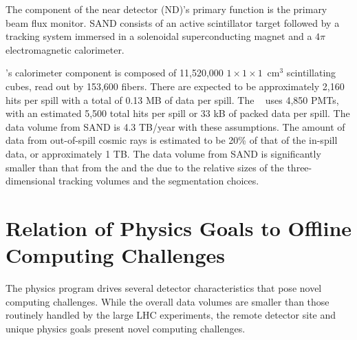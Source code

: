 \documentclass[../main-v1.tex]{subfiles}
\begin{document}
The  component of the near detector (ND)'s primary function is the primary beam flux monitor.   SAND consists of an active scintillator target  followed by a tracking system immersed in a solenoidal superconducting magnet  and  a $4\pi$ electromagnetic calorimeter.

's  calorimeter component is composed of 11,520,000 $1\times 1\times 1$~cm$^3$ scintillating cubes, read out by 153,600 fibers.  There are expected to be approximately 2,160 hits per spill with a total of 0.13 MB of data per spill.  The  ~\cite{Adinolfi:2002zx} uses 4,850 PMTs, with an estimated 5,500 total hits per spill or 33 kB of packed data per spill.   The data volume from SAND is 4.3 TB/year with these assumptions.  The amount of data from out-of-spill cosmic rays is estimated to be 20\% of that of the in-spill data, or approximately 1 TB.  The data volume from SAND is significantly smaller than that from the  and the  due to the relative sizes of the three-dimensional tracking volumes and the segmentation choices.






\section{Relation of Physics Goals to Offline Computing Challenges}

The physics program drives several detector characteristics that pose novel computing challenges.  While the overall data volumes are smaller than those routinely handled by the large LHC experiments, the remote detector site and unique physics goals present novel computing challenges. 
\end{document}
